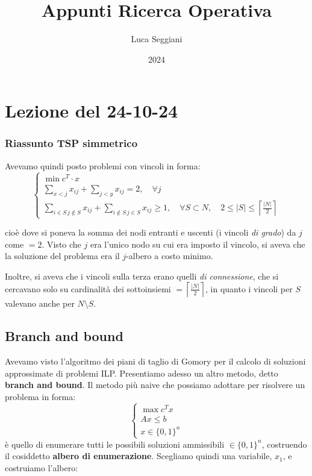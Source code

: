 \documentclass[a4paper,11pt]{article}
\title{Appunti Ricerca Operativa}
\author{Luca Seggiani}
\date{2024}
\begin{document}
\section{Lezione del 24-10-24}

\thispagestyle{empty}
\pagestyle{fancy}

\subsubsection{Riassunto TSP simmetrico}
Avevamo quindi posto problemi con vincoli  in forma:
\[
	\begin{cases}
			\min c^T \cdot x \\ 
			\sum\limits_{x < j} x_{ij} + \sum\limits_{j < y} x_{ij} = 2, \quad \forall j \\ 
			\sum\limits_{i \in S \, j \notin S} x_{ij} + \sum\limits_{i \notin S \, j \in S} x_{ij} \geq 1, \quad \forall S \subset N, \quad 2 \leq |S| \leq \left\lceil \frac{|N|}{2} \right\rceil  
	\end{cases}
\]

cioè dove si poneva la somma dei nodi entranti e uscenti (i vincoli \textit{di grado}) da $j$ come $=2$.
Visto che $j$ era l'unico nodo su cui era imposto il vincolo, si aveva che la soluzione del problema era il $j$-albero a costo minimo.

Inoltre, si aveva che i vincoli sulla terza erano quelli \textit{di connessione}, che si cercavano solo su cardinalità dei sottoinsiemi $= \left\lceil \frac{|N|}{2} \right\rceil $, in quanto i vincoli per $S$ valevano anche per $N \setminus S$.

\subsection{Branch and bound}
Avevamo visto l'algoritmo dei piani di taglio di Gomory per il calcolo di soluzioni approssimate di problemi ILP.
Presentiamo adesso un altro metodo, detto \textbf{branch and bound}.
Il metodo più naive che possiamo adottare per risolvere un problema in forma:
\[
	\begin{cases}
		\max c^T x \\ 
		A x\leq b \\ 
		x \in \{0, 1\}^n
	\end{cases}
\]
è quello di enumerare tutti le possibili soluzioni ammissibili $\in \{0,1\}^n$, costruendo il cosiddetto \textbf{albero di enumerazione}.
Scegliamo quindi una variabile, $x_1$, e costruiamo l'albero:
\end{document}
